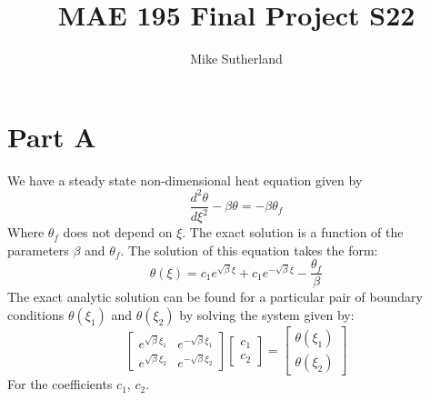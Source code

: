 \documentclass[10pt,letterpaper,notitlepage]{article}
\author{Mike Sutherland}
\title{MAE 195 Final Project S22}
\begin{document}
    \maketitle
    \section{Part A}
    \label{sec:parta}
    We have a steady state non-dimensional heat equation given by
    \begin{equation}
        \frac{d^2 \theta}{d\xi^2} - \beta \theta = -\beta \theta_f
        \label{eq:ss}
    \end{equation}
    Where $\theta_f$ does not depend on $\xi$. The exact solution is a function of the parameters $\beta$ and $\theta_f$. The solution of this equation takes the form:
    \begin{equation}
        \theta(\xi) = c_1 e^{\sqrt{\beta} \xi} + c_1 e^{-\sqrt{\beta} \xi} - \frac{\theta_f}{\beta}
    \end{equation}
    The exact analytic solution can be found for a particular pair of boundary conditions $\theta(\xi_1)$ and $\theta(\xi_2)$ by solving the system given by:
    \begin{equation}
        \begin{bmatrix}
            e^{\sqrt{\beta} \xi_1} & e^{-\sqrt{\beta} \xi_1} \\
            e^{\sqrt{\beta} \xi_2} & e^{-\sqrt{\beta} \xi_2} 
        \end{bmatrix}
        \begin{bmatrix}
            c_1 \\
            c_2
        \end{bmatrix}
        =
        \begin{bmatrix}
            \theta(\xi_1) \\
            \theta(\xi_2)
        \end{bmatrix}
    \end{equation}
    For the coefficients $c_1$, $c_2$.
\end{document}
